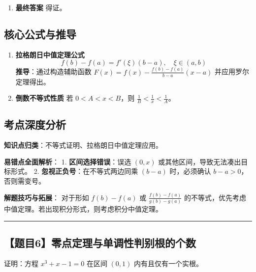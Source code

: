 \documentclass[UTF8]{ctexart}
\newenvironment{redenv}{\color{red}}{}
\newenvironment{detailedanalysis}{%
    \color{red}
    \begin{enumerate}[label=\textbf{第\arabic*步：}, leftmargin=*, align=left, itemsep=1.5ex]
}{%
    \end{enumerate}
}
\newenvironment{formuladerivation}{%
    \begin{enumerate}[label={\textbf{公式\arabic*：}}, leftmargin=*, align=left]
}{%
    \end{enumerate}
}
\newcommand{\problemrule}{\noindent\rule{\textwidth}{1.5pt}\vspace{-0.8em}}
\begin{document}
\begin{redenv}
\begin{detailedanalysis}
\item \textbf{最终答案}
得证。
\end{detailedanalysis}

\subsection*{核心公式与推导}
\begin{formuladerivation}
\item \textbf{拉格朗日中值定理公式}
\[ f(b) - f(a) = f'(\xi)(b-a), \quad \xi \in (a, b) \]
\textbf{推导}：通过构造辅助函数 $F(x) = f(x) - \frac{f(b)-f(a)}{b-a}(x-a)$ 并应用罗尔定理得出。

\item \textbf{倒数不等式性质}
若 $0 < A < x < B$，则 $\frac{1}{B} < \frac{1}{x} < \frac{1}{A}$。
\end{formuladerivation}

\subsection*{考点深度分析}
\begin{conceptbox}
\textbf{知识点归类}：不等式证明、拉格朗日中值定理应用。
\end{conceptbox}

\noindent\textbf{易错点全面解析}：
1. \textbf{区间选择错误}：误选 $(0, x)$ 或其他区间，导致无法凑出目标形式。
2. \textbf{忽视正负号}：在不等式两边同乘 $(b-a)$ 时，必须确认 $b-a > 0$，否则需变号。

\noindent\textbf{解题技巧与拓展}：
对于形如 $f(b)-f(a)$ 或 $\frac{f(b)-f(a)}{g(b)-g(a)}$ 的不等式，优先考虑中值定理。若出现积分形式，则考虑积分中值定理。
\end{redenv}

\vspace{2em}
\problemrule
\subsection*{【题目6】零点定理与单调性判别根的个数}
证明：方程 $x^3 + x - 1 = 0$ 在区间 $(0, 1)$ 内有且仅有一个实根。
\end{document}
